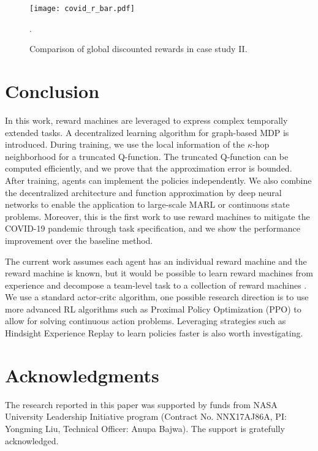\documentclass[conf]{new-aiaa}
\begin{document}
\begin{figure}[H]
\centering
\texttt{[image: covid\_r\_bar.pdf]}
\caption{Comparison of global discounted rewards in case study II.}.
\label{covid_r_bar}
\end{figure}



\section{Conclusion}

In this work, reward machines are leveraged to express complex temporally extended tasks. A decentralized learning algorithm for graph-based MDP is introduced. During training, we use the local information of the $\kappa$-hop neighborhood for a truncated Q-function. The truncated Q-function can be computed efficiently, and we prove that the approximation error is bounded. After training, agents can implement the policies independently. We also combine the decentralized architecture and function approximation by deep neural networks to enable the application to large-scale MARL or continuous state problems. Moreover, this is the first work to use reward machines to mitigate the COVID-19 pandemic through task specification, and we show the performance improvement over the baseline method.

The current work assumes each agent has an individual reward machine and the reward machine is known, but it would be possible to learn reward machines from experience \cite{xu2020joint} and decompose a team-level task to a collection of reward machines \cite{neary2020reward}. We use a standard actor-critc algorithm, one possible research direction is to use more advanced RL algorithms such as Proximal Policy Optimization (PPO) \cite{schulman2017proximal} to allow for solving continuous action problems. Leveraging strategies such as Hindsight Experience Replay \cite{andrychowicz2017hindsight} to learn policies faster is also worth investigating.





\section*{Acknowledgments}
The research reported in this paper was supported by funds from NASA University Leadership Initiative program (Contract No. NNX17AJ86A, PI: Yongming Liu, Technical Officer: Anupa Bajwa). The support is gratefully acknowledged.
\end{document}

